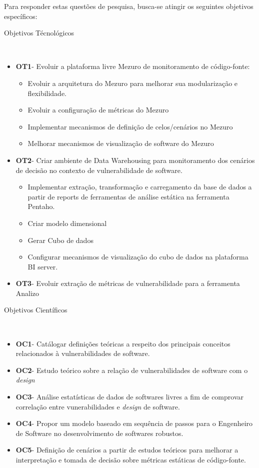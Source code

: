 %

Para responder estas questões de pesquisa, busca-se atingir os seguintes objetivos específicos:

%
\begin{description}
	\item [Objetivos Técnológicos]\
\end{description}
		\begin{itemize}
			\item \textbf{OT1}- Evoluir a plataforma livre Mezuro de monitoramento de código-fonte:
				\begin{itemize}
					\item Evoluir a arquitetura do Mezuro para melhorar sua modularização e flexibilidade.
					\item Evoluir a configuração de métricas do Mezuro
					\item Implementar mecanismos de definição de celos/cenários no Mezuro
					\item Melhorar mecanismos de visualização de software do Mezuro
				\end{itemize}
			\item \textbf{OT2}- Criar ambiente de Data Warehousing para monitoramento dos cenários de decisão no contexto de vulnerabilidade de software.	
	        	\begin{itemize}
	        		\item Implementar extração, transformação e carregamento da base de dados a partir de reports de ferramentas de análise estática na ferramenta Pentaho.
	        		\item Criar modelo dimensional
	        		\item Gerar Cubo de dados        
					\item Configurar mecanismos de visualização do cubo de dados na plataforma BI server.
	        	\end{itemize}
			\item \textbf{OT3}- Evoluir extração de métricas de vulnerabilidade para a ferramenta Analizo
		\end{itemize}
\begin{description}
	\item [Objetivos Científicos]\
\end{description}	
	 	\begin{itemize}
			\item \textbf{OC1}- Catálogar definições teóricas a respeito dos principais conceitos relacionados à vulnerabilidades de software.
			\item \textbf{OC2}- Estudo teórico sobre a relação de vulnerabilidades de software com o \emph{design}
			\item \textbf{OC3}- Análise estatísticas de dados de softwares livres a fim de comprovar correlação entre vunerabilidades e \emph{design} de software.
			\item \textbf{OC4}- Propor um modelo baseado em sequência de passos para o Engenheiro de Software no desenvolvimento de softwares robustos.
			\item \textbf{OC5}- Definição de cenários a partir de estudos teóricos para melhorar a interpretação e tomada de decisão sobre métricas estáticas de código-fonte.
	 	\end{itemize}
